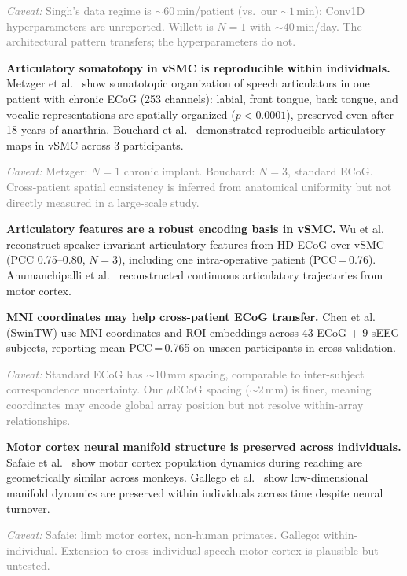 \documentclass[11pt,letterpaper]{article}
\newcommand{\caveat}[1]{\par\smallskip\noindent\textcolor{gray}{\textit{Caveat:} #1}\smallskip}
\begin{document}
\caveat{Singh's data regime is ${\sim}60$\,min/patient (vs.\ our ${\sim}1$\,min); Conv1D hyperparameters are unreported. Willett is $N{=}1$ with ${\sim}40$\,min/day. The architectural pattern transfers; the hyperparameters do not.}

\textbf{Articulatory somatotopy in vSMC is reproducible within individuals.} Metzger et al.~\cite{metzger2023} show somatotopic organization of speech articulators in one patient with chronic ECoG (253 channels): labial, front tongue, back tongue, and vocalic representations are spatially organized ($p{<}0.0001$), preserved even after 18 years of anarthria. Bouchard et al.~\cite{bouchard2013} demonstrated reproducible articulatory maps in vSMC across 3 participants.

\caveat{Metzger: $N{=}1$ chronic implant. Bouchard: $N{=}3$, standard ECoG. Cross-patient spatial consistency is inferred from anatomical uniformity but not directly measured in a large-scale study.}

\textbf{Articulatory features are a robust encoding basis in vSMC.} Wu et al.~\cite{wu2025} reconstruct speaker-invariant articulatory features from HD-ECoG over vSMC (PCC 0.75--0.80, $N{=}3$), including one intra-operative patient (PCC\,=\,0.76). Anumanchipalli et al.~\cite{anumanchipalli2019} reconstructed continuous articulatory trajectories from motor cortex.

\textbf{MNI coordinates may help cross-patient ECoG transfer.} Chen et al.~\cite{chen2025} (SwinTW) use MNI coordinates and ROI embeddings across 43 ECoG + 9 sEEG subjects, reporting mean PCC\,=\,0.765 on unseen participants in cross-validation.

\caveat{Standard ECoG has ${\sim}10$\,mm spacing, comparable to inter-subject correspondence uncertainty. Our $\mu$ECoG spacing (${\sim}2$\,mm) is finer, meaning coordinates may encode global array position but not resolve within-array relationships.}

\textbf{Motor cortex neural manifold structure is preserved across individuals.} Safaie et al.~\cite{safaie2023} show motor cortex population dynamics during reaching are geometrically similar across monkeys. Gallego et al.~\cite{gallego2020} show low-dimensional manifold dynamics are preserved within individuals across time despite neural turnover.

\caveat{Safaie: limb motor cortex, non-human primates. Gallego: within-individual. Extension to cross-individual speech motor cortex is plausible but untested.}
\end{document}
